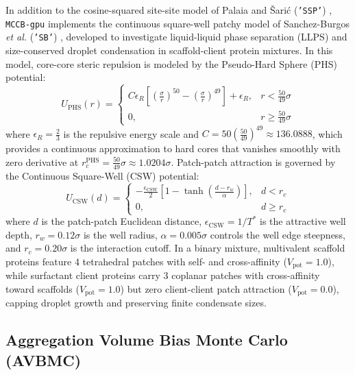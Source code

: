 \documentclass[final,5p,times,twocolumn]{elsarticle}
\begin{document}
In addition to the cosine-squared site-site model of Palaia and \v{S}ari\'{c} (\texttt{'SSP'}) \cite{palaia2022patchy}, \texttt{MCCB-gpu} implements the continuous square-well patchy model of Sanchez-Burgos \textit{et al.} (\texttt{'SB'}) \cite{sanchezburgos2021size}, developed to investigate liquid-liquid phase separation (LLPS) and size-conserved droplet condensation in scaffold-client protein mixtures. In this model, core-core steric repulsion is modeled by the Pseudo-Hard Sphere (PHS) potential:
\begin{equation}
    U_{\text{PHS}}(r) = \begin{cases}
        C \epsilon_R \left[ \left(\frac{\sigma}{r}\right)^{50} - \left(\frac{\sigma}{r}\right)^{49} \right] + \epsilon_R, & r < \frac{50}{49}\sigma \\
        0, & r \ge \frac{50}{49}\sigma
    \end{cases}
    \label{eq:u_phs}
\end{equation}
where $\epsilon_R = \frac{2}{3}$ is the repulsive energy scale and $C = 50 \left(\frac{50}{49}\right)^{49} \approx 136.0888$, which provides a continuous approximation to hard cores that vanishes smoothly with zero derivative at $r_c^{\text{PHS}} = \frac{50}{49}\sigma \approx 1.0204\sigma$. Patch-patch attraction is governed by the Continuous Square-Well (CSW) potential:
\begin{equation}
    U_{\text{CSW}}(d) = \begin{cases}
        -\frac{\epsilon_{\text{CSW}}}{2} \left[ 1 - \tanh\left(\frac{d - r_w}{\alpha}\right) \right], & d < r_c \\
        0, & d \ge r_c
    \end{cases}
    \label{eq:u_csw}
\end{equation}
where $d$ is the patch-patch Euclidean distance, $\epsilon_{\text{CSW}} = 1/T^*$ is the attractive well depth, $r_w = 0.12\sigma$ is the well radius, $\alpha = 0.005\sigma$ controls the well edge steepness, and $r_c = 0.20\sigma$ is the interaction cutoff. In a binary mixture, multivalent scaffold proteins feature 4 tetrahedral patches with self- and cross-affinity ($V_{\text{pot}} = 1.0$), while surfactant client proteins carry 3 coplanar patches with cross-affinity toward scaffolds ($V_{\text{pot}} = 1.0$) but zero client-client patch attraction ($V_{\text{pot}} = 0.0$), capping droplet growth and preserving finite condensate sizes.

\subsection{Aggregation Volume Bias Monte Carlo (AVBMC)}
\label{sec:algo_avbmc}
\end{document}
